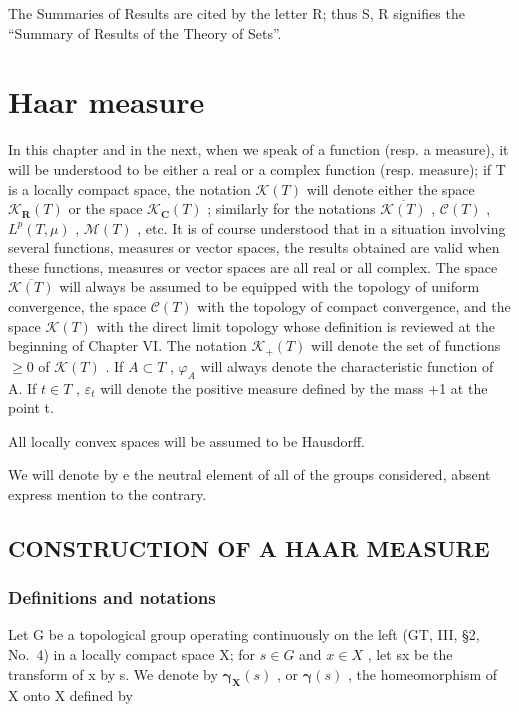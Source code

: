 The Summaries of Results are cited by the letter R; thus S, R signifies the ``Summary of Results of the Theory of Sets''.

\chapter{Haar measure}

In this chapter and in the next, when we speak of a function (resp. a measure), it will be understood to be either a real or a complex function (resp. measure); if T is a locally compact space, the notation \(\mathcal{K}(T)\) will denote either the space \(\mathcal{K}_{\mathbf{R}}(T)\) or the space \(\mathcal{K}_{\mathbf{C}}(T)\) ; similarly for the notations \(\overline{\mathcal{K}(T)}\) , \(\mathcal{C}(T)\) , \(L^{p}(T,\mu)\) , \(\mathcal{M}(T)\) , etc. It is of course understood that in a situation involving several functions, measures or vector spaces, the results obtained are valid when these functions, measures or vector spaces are all real or all complex. The space \(\overline{\mathcal{K}(T)}\) will always be assumed to be equipped with the topology of uniform convergence, the space \(\mathcal{C}(T)\) with the topology of compact convergence, and the space \(\mathcal{K}(T)\) with the direct limit topology whose definition is reviewed at the beginning of Chapter VI. The notation \(\mathcal{K}_{+}(T)\) will denote the set of functions \(\geqslant0\) of \(\mathcal{K}(T)\) . If \(A\subset T\) , \(\varphi_{A}\) will always denote the characteristic function of A. If \(t\in T\) , \(\varepsilon_{t}\) will denote the positive measure defined by the mass +1 at the point t.

All locally convex spaces will be assumed to be Hausdorff.

We will denote by e the neutral element of all of the groups considered, absent express mention to the contrary.

\section{CONSTRUCTION OF A HAAR MEASURE}

\subsection{Definitions and notations}

Let G be a topological group operating continuously on the left (GT, III, §2, No.~4) in a locally compact space X; for \(s \in G\) and \(x \in X\) , let sx be the transform of x by s. We denote by \(\boldsymbol{\gamma}_{\mathbf{X}}(s)\) , or \(\boldsymbol{\gamma}(s)\) , the homeomorphism of X onto X defined by

